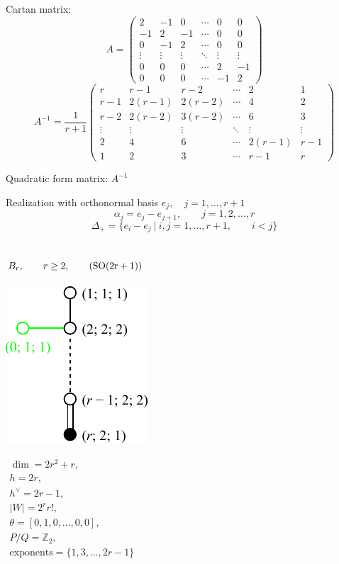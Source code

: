 \documentclass[12pt]{article}
\newcommand{\Zb}{\mathbb{Z}}
\newcommand{\SO}{\rm SO}
\newcommand{\hc}{h^{\vee}}
\begin{document}
Cartan matrix:
\[A=\left(
\begin{array}{cccccc}
 2 & -1& 0 &\cdots & 0 & 0 \\
 -1& 2 & -1 &\cdots & 0 & 0 \\
 0 & -1 & 2 &\cdots & 0 & 0 \\
  \vdots&\vdots &\vdots &\ddots &\vdots &\vdots \\
 0&0 &0 &\cdots & 2& -1\\
 0&0 &0 &\cdots & -1& 2
\end{array}
\right)
\]
\[
A^{-1}=\frac{1}{r+1}
\left(
\begin{array}{cccccc}
 r & r-1& r-2 &\cdots & 2 & 1 \\
 r-1& 2(r-1) & 2(r-2) &\cdots & 4 & 2 \\
 r-2& 2(r-2) & 3(r-2) &\cdots & 6 & 3 \\
  \vdots&\vdots &\vdots &\ddots &\vdots &\vdots \\
 2&4 &6 &\cdots & 2(r-1)& r-1\\
 1&2 &3 &\cdots & r-1& r
\end{array}
\right)
\]

Quadratic form matrix: $A^{-1}$

Realization with orthonormal basis $e_j,\quad j=1,\dots,r+1$
\[
 \alpha_{j}=e_j-e_{j+1},\qquad j=1,2,\dots,r
\]
\[
 \Delta_{+}=\{e_i-e_j\ |\ i,j=1,\dots,r+1,\qquad i<j\}
\]

\newpage
%
\subsection*{$B_r,\qquad r\ge 2,\qquad (\SO(2r+1))$}
\parbox{8cm}{\includegraphics{lie_B.pdf}}
$
\begin{array}{l}
 \dim = 2r^2+r, \\
  h= 2 r,\\
 \hc= 2 r-1,\\
 |W|=2^r r!,\\
 \theta=[0,1,0,\dots,0,0],\\
 P/Q=\Zb_2,\\
 \text{exponents}={\{1,3,\dots,2r-1\}}
\end{array}
$
\end{document}
